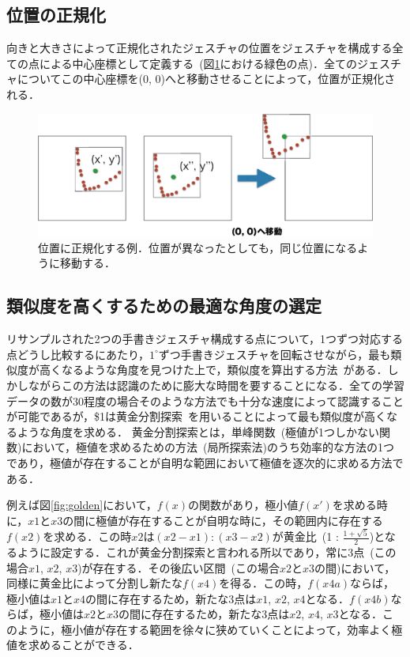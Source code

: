 \subsection{位置の正規化}
向きと大きさによって正規化されたジェスチャの位置をジェスチャを構成する全ての点による中心座標として定義する~(図\ref{fig:position}における緑色の点)．全てのジェスチャについてこの中心座標を(0, 0)へと移動させることによって，位置が正規化される．

\begin{figure} [!h]
\centering
\includegraphics [width=0.8\columnwidth]{img/position.eps}
\caption{位置に正規化する例．位置が異なったとしても，同じ位置になるように移動する．}
\label{fig:position}
\end{figure}

\subsection{類似度を高くするための最適な角度の選定}
リサンプルされた2つの手書きジェスチャ構成する点について，1つずつ対応する点どうし比較するにあたり，$1^\circ$ずつ手書きジェスチャを回転させながら，最も類似度が高くなるような角度を見つけた上で，類似度を算出する方法~\cite{Kara:2005:ITS:1652319.1652712}がある．しかしながらこの方法は認識のために膨大な時間を要することになる．全ての学習データの数が30程度の場合そのような方法でも十分な速度によって認識することが可能であるが，\$1は黄金分割探索~\cite{Press:1992:NRC:148286}を用いることによって最も類似度が高くなるような角度を求める．
黄金分割探索とは，単峰関数~(極値が1つしかない関数)において，極値を求めるための方法~(局所探索法)のうち効率的な方法の1つであり，極値が存在することが自明な範囲において極値を逐次的に求める方法である．

例えば図\ref{fig:golden}において，$f(x)$の関数があり，極小値$f(x')$を求める時に，$x1$と$x3$の間に極値が存在することが自明な時に，その範囲内に存在する$f(x2)$を求める．この時$x2$は$(x2 - x1) : (x3 - x2)$が黄金比~(1 : $\frac{1+\sqrt{5}}{2}$)となるように設定する．これが黄金分割探索と言われる所以であり，常に3点~(この場合$x1$, $x2$, $x3$)が存在する．その後広い区間~(この場合$x2$と$x3$の間)において，同様に黄金比によって分割し新たな$f(x4)$を得る．この時，$f(x4a)$ならば，極小値は$x1$と$x4$の間に存在するため，新たな3点は$x1$, $x2$, $x4$となる．$f(x4b)$ならば，極小値は$x2$と$x3$の間に存在するため，新たな3点は$x2$, $x4$, $x3$となる．このように，極小値が存在する範囲を徐々に狭めていくことによって，効率よく極値を求めることができる．

